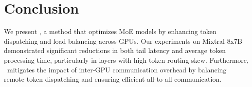 \section{Conclusion}
We present \expertune, a method that optimizes MoE models by enhancing token dispatching and load balancing across GPUs.
%
Our experiments on Mixtral-8x7B demonstrated significant reductions in both tail latency and average token processing time, particularly in layers with high token routing skew. 
%
Furthermore, \expertune~mitigates the impact of inter-GPU communication overhead by balancing remote token dispatching and ensuring efficient all-to-all communication.
%


%         
%         


